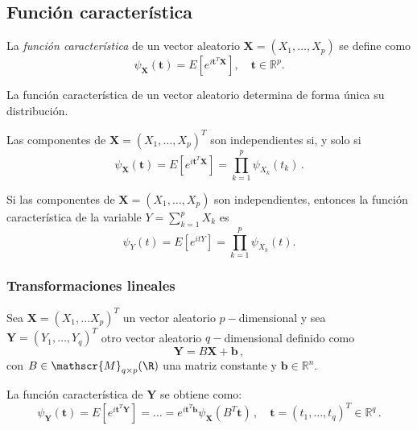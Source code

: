 \subsection{Función característica}

\begin{ndef}
    La \emph{función característica} de un vector aleatorio \(\boldsymbol X = (X_1,\dots,X_p)\) se define como \[\psi_{\boldsymbol X}(\boldsymbol t)=E\left[e^{i\boldsymbol t^T\boldsymbol X}\right], \quad \boldsymbol t\in \mathbb{R}^p.\]
\end{ndef}

\begin{nth}[Unicidad]
  La función característica de un vector aleatorio determina de forma única su distribución.
\end{nth}

\begin{nprop}
  Las componentes de \(\boldsymbol X=(X_1,\dots,X_p)^T\) son independientes si, y solo si \[\psi_{\boldsymbol X}(\boldsymbol t)=E\left[e^{i\boldsymbol t^T\boldsymbol X}\right] = \prod_{k=1}^p\psi_{X_k}(t_k)\,.\]
\end{nprop}

\begin{nprop}
  Si las componentes de \(\boldsymbol X=(X_1,\dots, X_p)\) son independientes, entonces la función característica de la variable \(Y=\sum_{k=1}^p X_k\) es \[\psi_{Y}(t)=E\left[e^{itY}\right] = \prod_{k=1}^p\psi_{X_k}(t).\]
\end{nprop}

\subsubsection{Transformaciones lineales}

Sea $\boldsymbol X = (X_1, \dots X_p)^T$ un vector aleatorio $p-$dimensional y sea $\boldsymbol Y = (Y_1,\dots,Y_q)^T$ otro vector aleatorio $q-$dimensional definido como
\[
  \boldsymbol Y = B\boldsymbol X + \boldsymbol b\,,
\]
con $B \in \mathscr{M}_{q\times p}(\R)$ una matriz constante y $\boldsymbol b\in \mathbb R ^n$.

\begin{nprop}
  La función característica de $\boldsymbol Y$ se obtiene como:
  \[
  \psi_{\boldsymbol Y}(\boldsymbol t) = E\left[e^{i\boldsymbol t^T \boldsymbol Y}\right] = \dots = e^{i\boldsymbol t^T \boldsymbol b} \psi_{\boldsymbol X}(B^T \boldsymbol t)\,, \quad \boldsymbol t = (t_1,\dots,t_q)^T \in \mathbb R^q\,.
  \]
\end{nprop}

